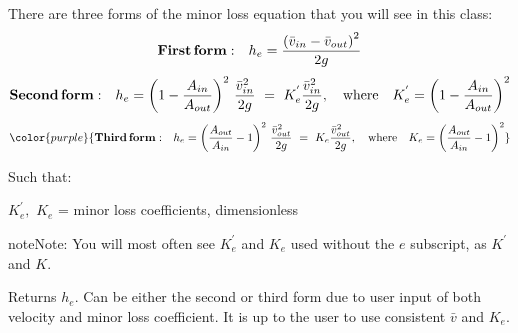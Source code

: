 \documentclass[letterpaper,10pt,english]{sphinxmanual}
\begin{document}
There are three forms of the minor loss equation that you will see in this class:
\begin{equation}\label{equation:Review/Review_Fluid_Mechanics:Review/Review_Fluid_Mechanics:11}
\begin{split}{\rm{ \mathbf{First \, form:} }} \quad h_e = \frac{\left( \bar v_{in}  - \bar v_{out} \right)^2}{2g}\end{split}
\end{equation}\begin{equation}\label{equation:Review/Review_Fluid_Mechanics:Review/Review_Fluid_Mechanics:12}
\begin{split}{\rm{ \mathbf{Second \, form:} }} \quad h_e = \left( 1 - \frac{A_{in}}{A_{out}} \right)^2 \, \frac{\bar v_{in}^2}{2g} \, \, = \, \, K_e^{'} \frac{\bar v_{in}^2}{2g}, \quad {\rm where} \quad K_e^{'} = \left( 1 - \frac{A_{in}}{A_{out}} \right)^2\end{split}
\end{equation}\begin{equation}\label{equation:Review/Review_Fluid_Mechanics:Review/Review_Fluid_Mechanics:13}
\begin{split}\color{purple}{
{\rm{ \mathbf{Third \, form:} }} \quad h_e = \left( \frac{A_{out}}{A_{in}} -1 \right)^2 \, \frac{\bar  v_{out}^2}{2g} \, \, = \, \, K_e \frac{\bar v_{out}^2}{2g}, \quad {\rm where} \quad K_e = \left( \frac{A_{out}}{A_{in}} - 1 \right)^2
}\end{split}
\end{equation}
\begin{DUlineblock}{0em}
\item[] Such that:
\item[] \(K_e^{'}, \,\, K_e\) = minor loss coefficients, dimensionless
\end{DUlineblock}

\begin{sphinxadmonition}{note}{Note:}
You will most often see \(K_e^{'}\) and \(K_e\) used without the \(e\) subscript,  as \(K^{'}\) and \(K\).
\end{sphinxadmonition}




  Returns \(h_e\). Can be either the second or third form due to user input of both velocity and minor loss coefficient. It is up to the user to use consistent \(\bar v\) and \(K_e\).
\end{document}
